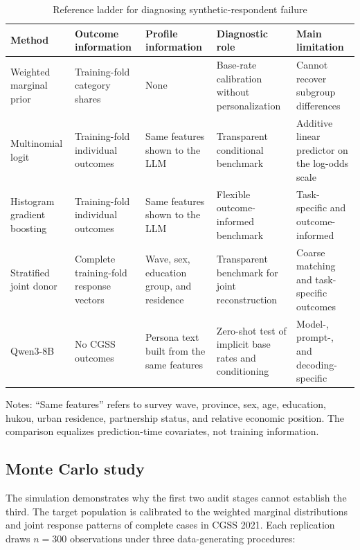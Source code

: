 \documentclass[10pt,twocolumn]{article}
\newcommand{\CGSS}{CGSS\xspace}
\begin{document}
\begin{table}[!htbp]
\centering
\caption{Reference ladder for diagnosing synthetic-respondent failure}
\label{tab:reference-ladder}
\begin{threeparttable}
\small
\begin{tabularx}{\textwidth}{lYYYY}
\toprule
Method & Outcome information & Profile information & Diagnostic role & Main limitation \\
\midrule
Weighted marginal prior
  & Training-fold category shares
  & None
  & Base-rate calibration without personalization
  & Cannot recover subgroup differences \\
Multinomial logit
  & Training-fold individual outcomes
  & Same features shown to the LLM
  & Transparent conditional benchmark
  & Additive linear predictor on the log-odds scale \\
Histogram gradient boosting
  & Training-fold individual outcomes
  & Same features shown to the LLM
  & Flexible outcome-informed benchmark
  & Task-specific and outcome-informed \\
Stratified joint donor
  & Complete training-fold response vectors
  & Wave, sex, education group, and residence
  & Transparent benchmark for joint reconstruction
  & Coarse matching and task-specific outcomes \\
Qwen3-8B
  & No CGSS outcomes
  & Persona text built from the same features
  & Zero-shot test of implicit base rates and conditioning
  & Model-, prompt-, and decoding-specific \\
\bottomrule
\end{tabularx}
\begin{tablenotes}[flushleft]
\footnotesize
\item Notes: ``Same features'' refers to survey wave, province, sex, age, education, hukou,
urban residence, partnership status, and relative economic position. The comparison equalizes
prediction-time covariates, not training information.
\end{tablenotes}
\end{threeparttable}
\end{table}

\subsection{Monte Carlo study}

The simulation demonstrates why the first two audit stages cannot establish the third. The target
population is calibrated to the weighted marginal distributions and joint response patterns of
complete cases in \CGSS 2021. Each replication draws $n=300$ observations under three data-generating
procedures:
\end{document}
